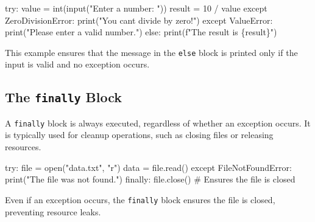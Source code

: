\documentclass[
  letterpaper,
  DIV=11,
  numbers=noendperiod]{scrreprt}
\newenvironment{Shaded}{\begin{snugshade}}{\end{snugshade}}
\newcommand{\BuiltInTok}[1]{\textcolor[rgb]{0.00,0.23,0.31}{#1}}
\newcommand{\CommentTok}[1]{\textcolor[rgb]{0.37,0.37,0.37}{#1}}
\newcommand{\ControlFlowTok}[1]{\textcolor[rgb]{0.00,0.23,0.31}{#1}}
\newcommand{\DecValTok}[1]{\textcolor[rgb]{0.68,0.00,0.00}{#1}}
\newcommand{\NormalTok}[1]{\textcolor[rgb]{0.00,0.23,0.31}{#1}}
\newcommand{\OperatorTok}[1]{\textcolor[rgb]{0.37,0.37,0.37}{#1}}
\newcommand{\PreprocessorTok}[1]{\textcolor[rgb]{0.68,0.00,0.00}{#1}}
\newcommand{\SpecialCharTok}[1]{\textcolor[rgb]{0.37,0.37,0.37}{#1}}
\newcommand{\SpecialStringTok}[1]{\textcolor[rgb]{0.13,0.47,0.30}{#1}}
\newcommand{\StringTok}[1]{\textcolor[rgb]{0.13,0.47,0.30}{#1}}
\begin{document}
\begin{Shaded}
\begin{Highlighting}[]
\ControlFlowTok{try}\NormalTok{:}
\NormalTok{    value }\OperatorTok{=} \BuiltInTok{int}\NormalTok{(}\BuiltInTok{input}\NormalTok{(}\StringTok{"Enter a number: "}\NormalTok{))}
\NormalTok{    result }\OperatorTok{=} \DecValTok{10} \OperatorTok{/}\NormalTok{ value}
\ControlFlowTok{except} \PreprocessorTok{ZeroDivisionError}\NormalTok{:}
    \BuiltInTok{print}\NormalTok{(}\StringTok{"You can\textquotesingle{}t divide by zero!"}\NormalTok{)}
\ControlFlowTok{except} \PreprocessorTok{ValueError}\NormalTok{:}
    \BuiltInTok{print}\NormalTok{(}\StringTok{"Please enter a valid number."}\NormalTok{)}
\ControlFlowTok{else}\NormalTok{:}
    \BuiltInTok{print}\NormalTok{(}\SpecialStringTok{f"The result is }\SpecialCharTok{\{}\NormalTok{result}\SpecialCharTok{\}}\SpecialStringTok{"}\NormalTok{)}
\end{Highlighting}
\end{Shaded}

This example ensures that the message in the \texttt{else} block is
printed only if the input is valid and no exception occurs.

\hypertarget{the-finally-block}{%
\subsection{\texorpdfstring{The \texttt{finally}
Block}{The finally Block}}\label{the-finally-block}}

A \texttt{finally} block is always executed, regardless of whether an
exception occurs. It is typically used for cleanup operations, such as
closing files or releasing resources.

\begin{Shaded}
\begin{Highlighting}[]
\ControlFlowTok{try}\NormalTok{:}
    \BuiltInTok{file} \OperatorTok{=} \BuiltInTok{open}\NormalTok{(}\StringTok{"data.txt"}\NormalTok{, }\StringTok{"r"}\NormalTok{)}
\NormalTok{    data }\OperatorTok{=} \BuiltInTok{file}\NormalTok{.read()}
\ControlFlowTok{except} \PreprocessorTok{FileNotFoundError}\NormalTok{:}
    \BuiltInTok{print}\NormalTok{(}\StringTok{"The file was not found."}\NormalTok{)}
\ControlFlowTok{finally}\NormalTok{:}
    \BuiltInTok{file}\NormalTok{.close()  }\CommentTok{\# Ensures the file is closed}
\end{Highlighting}
\end{Shaded}

Even if an exception occurs, the \texttt{finally} block ensures the file
is closed, preventing resource leaks.
\end{document}
